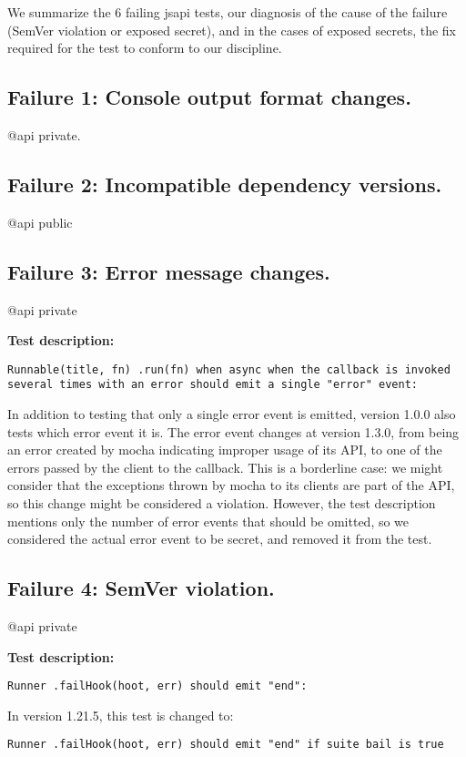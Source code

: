 We summarize the 6 failing jsapi tests, our diagnosis of the cause of
the failure (SemVer violation or exposed secret), and in the cases of
exposed secrets, the fix required for the test to conform to our
discipline.

\subsection{Failure 1: Console output format changes.}
@api private.

\subsection{Failure 2: Incompatible dependency versions.}
@api public

\subsection{Failure 3: Error message changes.}
@api private

{\bf Test description: }
\begin{verbatim}
Runnable(title, fn) .run(fn) when async when the callback is invoked several times with an error should emit a single "error" event:
\end{verbatim}

In addition to testing that only a single error event is emitted,
version 1.0.0 also tests which error event it is. The error event
changes at version 1.3.0, from being an error created by mocha
indicating improper usage of its API, to one of the errors passed by
the client to the callback. This is a borderline case: we might
consider that the exceptions thrown by mocha to its clients are part
of the API, so this change might be considered a violation. However,
the test description mentions only the number of error events that
should be omitted, so we considered the actual error event to be
secret, and removed it from the test.

\subsection{Failure 4: SemVer violation.}
@api private

{\bf Test description:}
\begin{verbatim}
Runner .failHook(hoot, err) should emit "end":
\end{verbatim}

In version 1.21.5, this test is changed to:
\begin{verbatim}
Runner .failHook(hoot, err) should emit "end" if suite bail is true
\end{verbatim}

